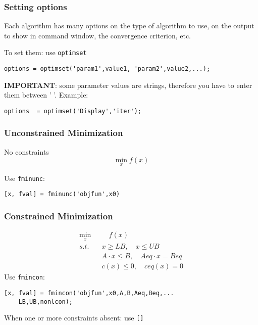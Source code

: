 \documentclass[show notes]{beamer}%
\begin{document}
{\begin{frame}[fragile]
\begin{enumerate}
\end{enumerate}

\end{frame}



\begin{frame}[fragile]
\frametitle{Setting options}

Each algorithm has many options on the type of algorithm to use, on the output to show in command window, the convergence criterion, etc. \pause

To set them: use \texttt{optimset}
{\small
\begin{lstlisting}
options = optimset('param1',value1, 'param2',value2,...);
\end{lstlisting}
}\pause

\textbf{IMPORTANT}: some parameter values are strings, therefore you have to enter them between '    '. Example:

\begin{lstlisting}
options  = optimset('Display','iter');
\end{lstlisting}

\end{frame}




\begin{frame}[fragile]
\frametitle{Unconstrained Minimization}
No constraints
\begin{equation*}
\min_{x} f(x)
\end{equation*} \pause

Use \texttt{fminunc}:

\begin{lstlisting}
[x, fval] = fminunc('objfun',x0)
\end{lstlisting}
\end{frame}

\begin{frame}[fragile]
\frametitle{Constrained Minimization}

\begin{align*}
\min_{x} &\quad f(x) \\
s.t. \quad & x \geq LB, \quad x \leq UB \\
& A \cdot x \leq B, \quad Aeq \cdot x = Beq \\
& c(x) \leq 0, \quad ceq(x) = 0
\end{align*} \pause
Use \texttt{fmincon}:

\begin{lstlisting}
[x, fval] = fmincon('objfun',x0,A,B,Aeq,Beq,...
    LB,UB,nonlcon);
\end{lstlisting}
When one or more constraints absent: use \texttt{[]}


\end{frame}}
\end{document}
